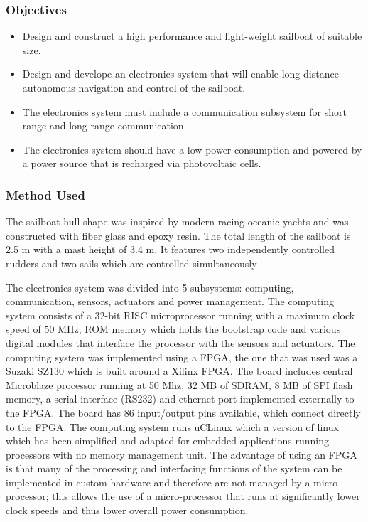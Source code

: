 \subsubsection{Objectives}
\begin{itemize}
    \item Design and construct a high performance and light-weight sailboat of suitable size.
    \item Design and develope an electronics system that will enable long distance autonomous navigation and control of the sailboat.
    \item The electronics system must include a communication subsystem for short range and long range communication.
    \item The electronics system should have a low power consumption and powered by a power source that is recharged via photovoltaic cells.
\end{itemize}

\subsubsection{Method Used}
The sailboat hull shape was inspired by modern racing oceanic yachts and was constructed with fiber glass and epoxy resin. The total length of the sailboat is 2.5 m with a mast height 
of 3.4 m. It features two independently controlled rudders and two sails which are controlled simultaneously

The electronics system was divided into 5 subsystems: computing, communication, sensors, actuators and power management. The computing system consists of a 32-bit RISC microprocessor 
running with a maximum clock speed of 50 MHz, ROM memory which holds the bootstrap code and various digital modules that interface the processor with the sensors and actuators. The 
computing system was implemented using a FPGA, the one that was used was a Suzaki SZ130 which is built around a Xilinx FPGA. The board includes central Microblaze processor running
at 50 Mhz, 32 MB of SDRAM, 8 MB of SPI flash memory, a serial interface (RS232) and ethernet port implemented externally to the FPGA. The board has 86 input/output pins available,
which connect directly to the FPGA. The computing system runs uCLinux which a version of linux which has been simplified and adapted for embedded applications running processors 
with no memory management unit. The advantage of using an FPGA is that many of the processing and interfacing functions of the system can be implemented in custom hardware and 
therefore are not managed by a micro-processor; this allows the use of a micro-processor that runs at significantly lower clock speeds and thus lower overall power consumption.


